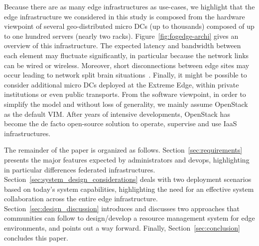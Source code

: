 Because there are as many edge infrastructures as use-cases, we
highlight that the edge infrastructure we considered in this
study is composed from the hardware viewpoint of several
geo-distributed micro DCs (up to thousands)
composed of up to one hundred servers (nearly two racks).
Figure~\ref{fig:fogedge-archi} gives an overview of this
infrastructure. The expected latency and bandwidth between
each element may fluctuate significantly, in particular because the
network links can be wired or wireless. Moreover, short disconnections
between edge sites may occur leading to network split brain
situations~\cite{4456903}. Finally, it might be possible
to consider additional micro DCs deployed at the Extreme Edge, within
private institutions or even public transports.
%
From the software viewpoint, in order to simplify the model and
without loss of generality, we mainly assume OpenStack ~\cite{openstack:www} as the default VIM.  After years of intensive developments, OpenStack has
become the de facto open-source solution to operate, supervise and use
IaaS infrastructures.

The remainder of the paper is organized as
follows. Section~\ref{sec:requirements} presents the major features
expected by administrators and devops, highlighting in particular
differences \wrt federated infrastructures.
Section~\ref{sec:system_design_considerations} deals with two
deployment scenarios based on today's system capabilities,
highlighting the need for an effective system collaboration across the
entire edge infrastructure. Section~\ref{sec:design_discussion}
introduces and discusses two approaches that communities can follow to
design/develop a resource management system for edge
environments, and points out a way forward. Finally,
Section~\ref{sec:conclusion} concludes this paper.


